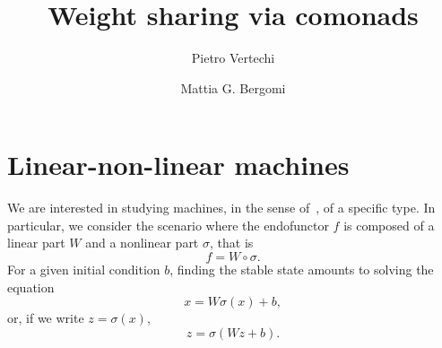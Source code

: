 \documentclass[12pt]{article}
\title{Weight sharing via comonads}
\author{
    Pietro Vertechi \and Mattia G. Bergomi
}
\date{}
\begin{document}
\maketitle
\begin{abstract}
\end{abstract}

\section{Linear-non-linear machines}

We are interested in studying machines, in the sense of~\cite{2020arXiv200702777V}, of a specific type. In particular, we consider the scenario where the endofunctor $f$ is composed of a linear part $W$ and a nonlinear part $\sigma$, that is
\begin{equation*}
    f = W\circ \sigma.
\end{equation*}
For a given initial condition $b$, finding the stable state amounts to solving the equation
\begin{equation*}
    x = W\sigma(x) + b,
\end{equation*}
or, if we write $z = \sigma(x)$,
\begin{equation*}
    z = \sigma(Wz + b).
\end{equation*}
\end{document}
